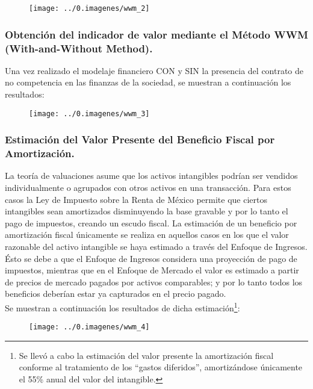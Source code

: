 \begin{figure}[H]
\centering
\texttt{[image: ../0.imagenes/wwm\_2]}
\end{figure}


\subsubsection{Obtención del indicador de valor mediante el Método WWM (With-and-Without Method).}

 Una vez realizado el modelaje financiero CON y SIN la presencia del contrato de no competencia en las finanzas de la sociedad, se muestran a continuación los resultados:

\begin{figure}[H]
\centering
\texttt{[image: ../0.imagenes/wwm\_3]}
\end{figure}


\subsubsection{Estimación del Valor Presente del Beneficio Fiscal por Amortización.}

 La teoría de valuaciones asume que los activos intangibles podrían ser vendidos individualmente o agrupados con otros activos en una transacción. Para estos casos la Ley de Impuesto sobre la Renta de México permite que ciertos intangibles sean amortizados disminuyendo la base gravable y por lo tanto el pago de impuestos, creando un escudo fiscal. La estimación de un beneficio por amortización fiscal únicamente se realiza en aquellos casos en los que el valor razonable del activo intangible se haya estimado a través del Enfoque de Ingresos. Ésto se debe a que el Enfoque de Ingresos considera una proyección de pago de impuestos, mientras que en el Enfoque de Mercado el valor es estimado a partir de precios de mercado pagados por activos comparables; y por lo tanto todos los beneficios deberían estar ya capturados en el precio pagado.\\

Se muestran a continuación los resultados de dicha estimación\footnote{Se llevó a cabo la estimación del valor presente la amortización fiscal conforme al tratamiento de los ``gastos diferidos'', amortizándose únicamente el 55\% anual del valor del intangible.}:

\begin{figure}[H]
\centering
\texttt{[image: ../0.imagenes/wwm\_4]}
\end{figure}

